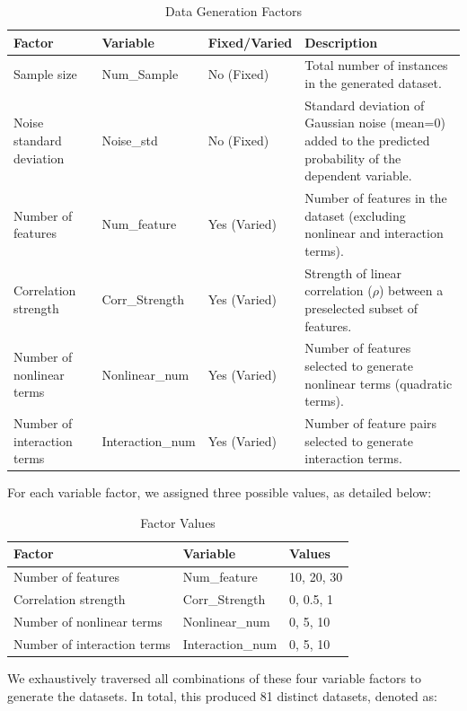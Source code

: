 \documentclass{article}
\begin{document}
\begin{table}[H]
\centering
\caption{Data Generation Factors}
\begin{tabularx}{\linewidth}{
>{\hsize=1\hsize\arraybackslash}X
>{\hsize=0.8\hsize\arraybackslash}X
>{\hsize=0.8\hsize\arraybackslash}X
>{\hsize=1.4\hsize\arraybackslash}X}
\toprule
Factor & Variable & Fixed/Varied & Description \\
\midrule
Sample size & Num\_Sample & No (Fixed) & Total number of instances in the generated dataset. \\
Noise standard deviation & Noise\_std & No (Fixed) & Standard deviation of Gaussian noise (mean=0) added to the predicted probability of the dependent variable. \\
Number of features & Num\_feature & Yes (Varied) & Number of features in the dataset (excluding nonlinear and interaction terms). \\
Correlation strength & Corr\_Strength & Yes (Varied) & Strength of linear correlation ($\rho$) between a preselected subset of features. \\
Number of nonlinear terms & Nonlinear\_num & Yes (Varied) & Number of features selected to generate nonlinear terms (quadratic terms). \\
Number of interaction terms & Interaction\_num & Yes (Varied) & Number of feature pairs selected to generate interaction terms. \\
\bottomrule
\end{tabularx}
\end{table}

For each variable factor, we assigned three possible values, as detailed below:

\begin{table}[H]
\centering
\caption{Factor Values}
\begin{tabular}{lll}
\toprule
Factor & Variable & Values \\
\midrule
Number of features & Num\_feature & 10, 20, 30 \\
Correlation strength & Corr\_Strength & 0, 0.5, 1 \\
Number of nonlinear terms & Nonlinear\_num & 0, 5, 10 \\
Number of interaction terms & Interaction\_num & 0, 5, 10 \\
\bottomrule
\end{tabular}
\end{table}

We exhaustively traversed all combinations of these four variable factors to generate the datasets. In total, this produced 81 distinct datasets, denoted as:
\end{document}

